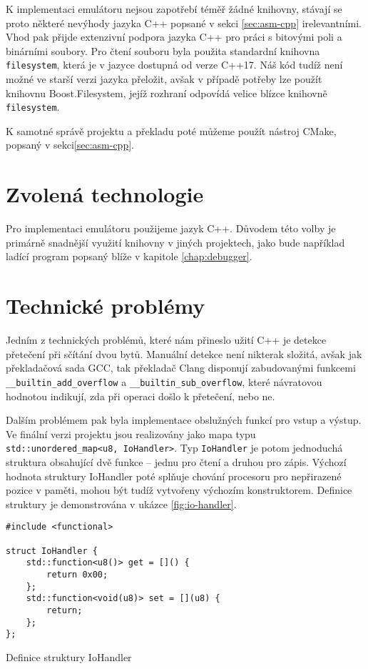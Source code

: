 K implementaci emulátoru nejsou zapotřebí téměř žádné knihovny, stávají se proto některé nevýhody jazyka C++ popsané v sekci \ref{sec:asm-cpp} irelevantními. Vhod pak přijde extenzivní podpora jazyka C++ pro práci s bitovými poli a binárními soubory. Pro čtení souboru byla použita standardní knihovna \texttt{filesystem}, která je v jazyce dostupná od verze C++17. Náš kód tudíž není možné ve starší verzi jazyka přeložit, avšak v případě potřeby lze použít knihovnu Boost.Filesystem, jejíž rozhraní odpovídá velice blízce knihovně \texttt{filesystem}.

K samotné správě projektu a překladu poté můžeme použít nástroj CMake, popsaný v sekci\ref{sec:asm-cpp}.

\section{Zvolená technologie}

Pro implementaci emulátoru použijeme jazyk C++. Důvodem této volby je primárně snadnější využití knihovny v jiných projektech, jako bude například ladící program popsaný blíže v kapitole \ref{chap:debugger}.

\section{Technické problémy}

Jedním z technických problémů, které nám přineslo užití C++ je detekce přetečení při sčítání dvou bytů. Manuální detekce není nikterak složitá, avšak jak překladačová sada GCC\cite{gcc-overflow}, tak překladač Clang\cite{clang-overflow} disponují zabudovanými funkcemi \texttt{\_\_builtin\_add\_overflow} a \texttt{\_\_builtin\_sub\_overflow}, které návratovou hodnotou indikují, zda při operaci došlo k přetečení, nebo ne.

Dalším problémem pak byla implementace obslužných funkcí pro vstup a výstup. Ve finální verzi projektu jsou realizovány jako mapa typu \texttt{std::unordered_map<u8, IoHandler>}. Typ \texttt{IoHandler} je potom jednoduchá struktura obsahující dvě funkce -- jednu pro čtení a druhou pro zápis. Výchozí hodnota struktury IoHandler poté splňuje chování procesoru pro nepřirazené pozice v paměti, mohou být tudíž vytvořeny výchozím konstruktorem. Definice struktury je demonstrována v ukázce \ref{fig:io-handler}.

\begin{listing}
\begin{verbatim}
#include <functional>

struct IoHandler {
    std::function<u8()> get = []() {
        return 0x00;
    };
    std::function<void(u8)> set = [](u8) {
        return;
    };
};
\end{verbatim}
\caption{Definice struktury IoHandler}
\label{fig:io-handler}
\end{listing}

